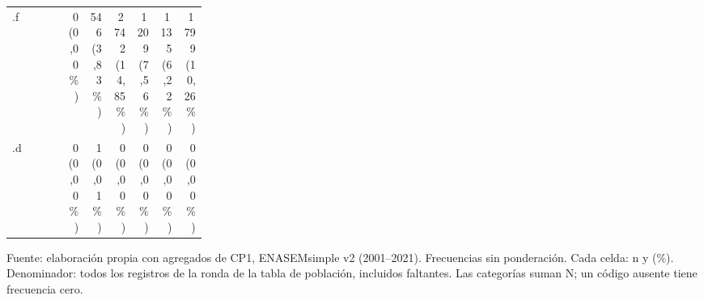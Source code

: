 \begin{table}[!htbp]
\begin{tabular}{p{0.28\linewidth}rrrrrr}
.f & \shortstack[r]{0\\(0,00\%)} & \shortstack[r]{546\\(3,83\%)} & \shortstack[r]{2\,742\\(14,85\%)} & \shortstack[r]{1\,209\\(7,56\%)} & \shortstack[r]{1\,135\\(6,22\%)} & \shortstack[r]{1\,799\\(10,26\%)} \\
.d & \shortstack[r]{0\\(0,00\%)} & \shortstack[r]{1\\(0,01\%)} & \shortstack[r]{0\\(0,00\%)} & \shortstack[r]{0\\(0,00\%)} & \shortstack[r]{0\\(0,00\%)} & \shortstack[r]{0\\(0,00\%)} \\
\bottomrule
\end{tabular}
\par\medskip
\parbox{\linewidth}{\footnotesize Fuente: elaboración propia con agregados de CP1, ENASEMsimple v2 (2001--2021). Frecuencias sin ponderación. Cada celda: n y (\%). Denominador: todos los registros de la ronda de la tabla de población, incluidos faltantes. Las categorías suman N; un código ausente tiene frecuencia cero.}
\end{table}
